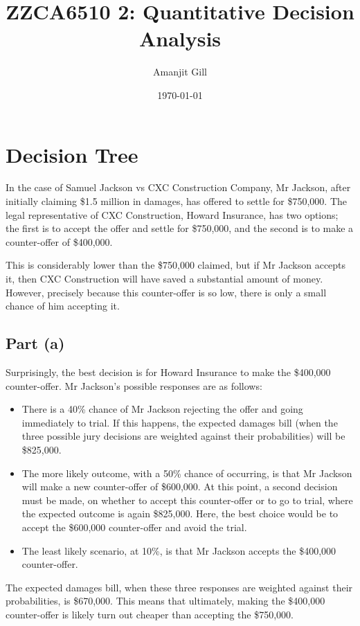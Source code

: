 \documentclass[11pt, a4paper]{article}
\title{\Large\bfseries ZZCA6510 2: Quantitative Decision Analysis}
\author{\large Amanjit Gill}
\date{\small \today}
\begin{document}
    
    \maketitle

    \section{Decision Tree}

    In the case of Samuel Jackson vs CXC Construction Company, Mr Jackson, after initially claiming \$1.5 million in damages, has offered to settle for \$750,000. The legal representative of CXC Construction, Howard Insurance, has two options; the first is to accept the offer and settle for \$750,000, and the second is to make a counter-offer of \$400,000. 

    This is considerably lower than the \$750,000 claimed, but if Mr Jackson accepts it, then CXC Construction will have saved a substantial amount of money. However, precisely because this counter-offer is so low, there is only a small chance of him accepting it.

    \subsection*{Part (a)}

    Surprisingly, the best decision is for Howard Insurance to make the \$400,000 counter-offer. Mr Jackson's possible responses are as follows:

    \begin{itemize}
        \item There is a 40\% chance of Mr Jackson rejecting the offer and going immediately to trial. If this happens, the expected damages bill (when the three possible jury decisions are weighted against their probabilities) will be \$825,000.
        \item The more likely outcome, with a 50\% chance of occurring, is that Mr Jackson will make a new counter-offer of \$600,000. At this point, a second decision must be made, on whether to accept this counter-offer or to go to trial, where the expected outcome is again \$825,000. Here, the best choice would be to accept the \$600,000 counter-offer and avoid the trial.
        \item The least likely scenario, at 10\%, is that Mr Jackson accepts the \$400,000 counter-offer.
    \end{itemize}

    The expected damages bill, when these three responses are weighted against their probabilities, is \$670,000. This means that ultimately, making the \$400,000 counter-offer is likely turn out cheaper than accepting the \$750,000.
\end{document}
